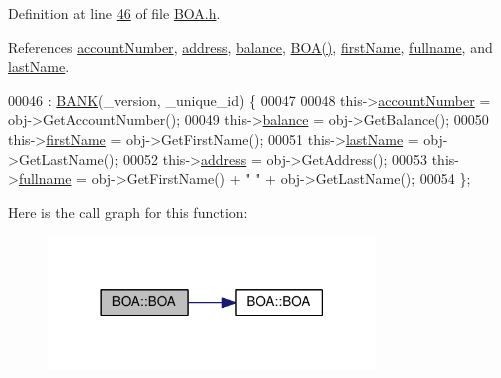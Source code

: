Definition at line \hyperlink{_b_o_a_8h_source_l00046}{46} of file \hyperlink{_b_o_a_8h_source}{B\+O\+A.\+h}.



References \hyperlink{_b_o_a_8h_source_l00098}{account\+Number}, \hyperlink{_b_o_a_8h_source_l00100}{address}, \hyperlink{_b_o_a_8h_source_l00099}{balance}, \hyperlink{_b_o_a_8h_source_l00024}{B\+O\+A()}, \hyperlink{_b_o_a_8h_source_l00096}{first\+Name}, \hyperlink{_b_o_a_8h_source_l00095}{fullname}, and \hyperlink{_b_o_a_8h_source_l00097}{last\+Name}.


\begin{DoxyCode}
00046                                                                : \hyperlink{class_b_a_n_k_a0bc938356cebff14fb0560264abe5a34_a0bc938356cebff14fb0560264abe5a34}{BANK}(\_version, \_unique\_id) \{
00047  
00048         this->\hyperlink{class_b_o_a_a86ca4ad716db205f04c337b39b34d9ba_a86ca4ad716db205f04c337b39b34d9ba}{accountNumber} = obj->GetAccountNumber();
00049         this->\hyperlink{class_b_o_a_a2061c36a15924de9186ec5c83dc7da2f_a2061c36a15924de9186ec5c83dc7da2f}{balance} = obj->GetBalance();
00050         this->\hyperlink{class_b_o_a_acb1b3b2a69e403c4e0e3fb08fdbb52a0_acb1b3b2a69e403c4e0e3fb08fdbb52a0}{firstName} = obj->GetFirstName();
00051         this->\hyperlink{class_b_o_a_ab7749e6e945beaca57a3ef01259c6fea_ab7749e6e945beaca57a3ef01259c6fea}{lastName} = obj->GetLastName();
00052         this->\hyperlink{class_b_o_a_afb2d7d0c5c05169a72bbc6f1d2cc737f_afb2d7d0c5c05169a72bbc6f1d2cc737f}{address} = obj->GetAddress();
00053         this->\hyperlink{class_b_o_a_aed3225e383c08b1b7c962a0e43b180d1_aed3225e383c08b1b7c962a0e43b180d1}{fullname} = obj->GetFirstName() + \textcolor{stringliteral}{" "} + obj->GetLastName();
00054     \};
\end{DoxyCode}


Here is the call graph for this function\+:
\nopagebreak
\begin{figure}[H]
\begin{center}
\leavevmode
\includegraphics[width=246pt]{class_b_o_a_ab87192ed986e601c2eb682ea3745daf0_ab87192ed986e601c2eb682ea3745daf0_cgraph}
\end{center}
\end{figure}


